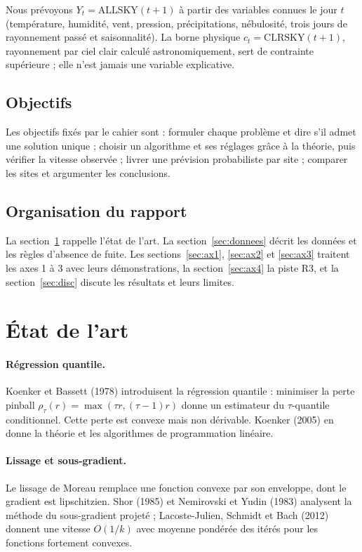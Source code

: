 \documentclass[11pt,a4paper]{article}
\theoremstyle{remark}
\theoremstyle{definition}
\newcommand{\pinball}{\rho_\tau}
\begin{document}
Nous prévoyons $Y_t = \mathrm{ALLSKY}(t+1)$ à partir des variables connues le jour $t$ (température, humidité, vent, pression,
précipitations, nébulosité, trois jours de rayonnement passé et saisonnalité). La borne physique $c_t = \mathrm{CLRSKY}(t+1)$, rayonnement
par ciel clair calculé astronomiquement, sert de contrainte supérieure ; elle n'est jamais une variable explicative.

\subsection{Objectifs}
Les objectifs fixés par le cahier sont : formuler chaque problème et dire s'il admet une solution unique ; choisir un algorithme
et ses réglages grâce à la théorie, puis vérifier la vitesse observée ; livrer une prévision probabiliste par site ; comparer les sites
et argumenter les conclusions.

\subsection{Organisation du rapport}
La section~\ref{sec:etat} rappelle l'état de l'art. La section~\ref{sec:donnees} décrit les données et les règles d'absence de fuite.
Les sections~\ref{sec:ax1}, \ref{sec:ax2} et \ref{sec:ax3} traitent les axes 1 à 3 avec leurs démonstrations, la section~\ref{sec:ax4}
la piste R3, et la section~\ref{sec:disc} discute les résultats et leurs limites.

\section{État de l'art}\label{sec:etat}
\paragraph{Régression quantile.} Koenker et Bassett (1978) introduisent la régression quantile : minimiser la perte pinball
$\pinball(r) = \max(\tau r, (\tau-1)r)$ donne un estimateur du $\tau$-quantile conditionnel. Cette perte est convexe mais non dérivable.
Koenker (2005) en donne la théorie et les algorithmes de programmation linéaire.

\paragraph{Lissage et sous-gradient.} Le lissage de Moreau remplace une fonction convexe par son enveloppe, dont le gradient est
lipschitzien. Shor (1985) et Nemirovski et Yudin (1983) analysent la méthode du sous-gradient projeté ; Lacoste-Julien, Schmidt et Bach (2012)
donnent une vitesse $O(1/k)$ avec moyenne pondérée des itérés pour les fonctions fortement convexes.
\end{document}
